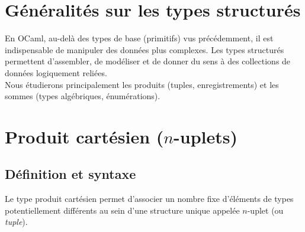 \documentclass{article}
\begin{document}

\section{Généralités sur les types structurés}

En OCaml, au-delà des types de base (primitifs) vus précédemment, il est indispensable de manipuler des données plus complexes. Les types structurés permettent d'assembler, de modéliser et de donner du sens à des collections de données logiquement reliées. \\

Nous étudierons principalement les produits (tuples, enregistrements) et les sommes (types algébriques, énumérations).

\section{Produit cartésien ($n$-uplets)}
\subsection{Définition et syntaxe}
Le type produit cartésien permet d'associer un nombre fixe d'éléments de types potentiellement différents au sein d'une structure unique appelée $n$-uplet (ou \textit{tuple}).



\end{document}
